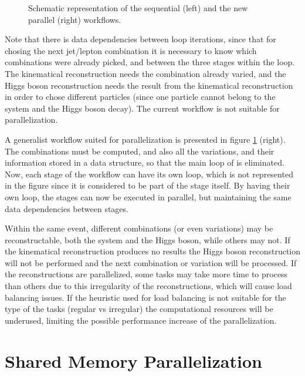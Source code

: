 \begin{figure}[!htp]
\begin{center}
		\caption{Schematic representation of the \ttDilepKinFit sequential (left) and the new parallel (right) workflows.}
		\label{fig:SeqPipeline}
	\end{center}
\end{figure}

Note that there is data dependencies between loop iterations, since that for chosing the next jet/lepton combination it is necessary to know which combinations were already picked, and between the three stages within the loop. The kinematical reconstruction needs the combination already varied, and the Higgs boson reconstruction needs the result from the kinematical reconstruction in order to chose different particles (since one particle cannot belong to the \ttbar system and the Higgs boson decay). The current workflow is not suitable for parallelization.

A generalist workflow suited for parallelization is presented in figure \ref{fig:SeqPipeline} (right). The combinations must be computed, and also all the variations, and their information stored in a data structure, so that the main loop of \ttDilepKinFit is eliminated. Now, each stage of the workflow can have its own loop, which is not represented in the figure since it is considered to be part of the stage itself. By having their own loop, the stages can now be executed in parallel, but maintaining the same data dependencies between stages.

Within the same event, different combinations (or even variations) may be reconstructable, both the \ttbar system and the Higgs boson, while others may not. If the kinematical reconstruction produces no results the Higgs boson reconstruction will not be performed and the next combination or variation will be processed. If the reconstructions are parallelized, some tasks may take more time to process than others due to this irregularity of the reconstructions, which will cause load balancing issues. If the heuristic used for load balancing is not suitable for the type of the tasks (regular vs irregular) the computational resources will be underused, limiting the possible performance increase of the parallelization.

\section{Shared Memory Parallelization}
\label{Parallelization:SharedMem}

